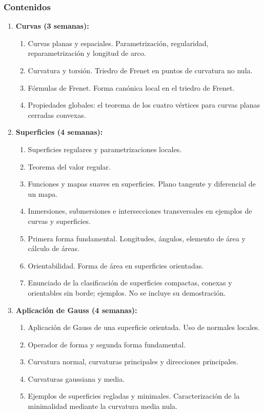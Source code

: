 \begin{refsection}
\subsubsection*{Contenidos}

\begin{enumerate}
\item \textbf{Curvas (3 semanas):} 
\begin{enumerate}
    \item Curvas planas y espaciales. Parametrización, regularidad,  reparametrización y longitud de arco. 
    \item Curvatura y torsión. Triedro de Frenet en puntos de curvatura no nula.
    \item Fórmulas de Frenet. Forma canónica local en el triedro de Frenet.
    \item Propiedades globales: el teorema de los cuatro vértices para curvas planas cerradas convexas.
\end{enumerate}

\item \textbf{Superficies (4 semanas):} 
\begin{enumerate}
      \item Superficies regulares y parametrizaciones locales.
      \item Teorema del valor regular.
      \item Funciones y mapas suaves en superficies. Plano tangente y diferencial de un mapa.
      \item Inmersiones, submersiones e intersecciones transversales en ejemplos de curvas y superficies.
      \item Primera forma fundamental. Longitudes, ángulos, elemento de área y cálculo de áreas.
      \item Orientabilidad. Forma de área en superficies orientadas.
      \item Enunciado de la clasificación de superficies compactas, conexas y orientables sin borde; ejemplos. No se incluye su demostración.
\end{enumerate}

\item \textbf{Aplicación de Gauss (4 semanas):} 
\begin{enumerate}
      \item Aplicación de Gauss de una superficie orientada. Uso de normales locales.
      \item Operador de forma y segunda forma fundamental.
      \item Curvatura normal, curvaturas principales y direcciones principales.
      \item Curvaturas gaussiana y media.
      \item Ejemplos de superficies regladas y minimales. Caracterización de la minimalidad mediante la curvatura media nula.
\end{enumerate}


\end{enumerate}
\end{refsection}
